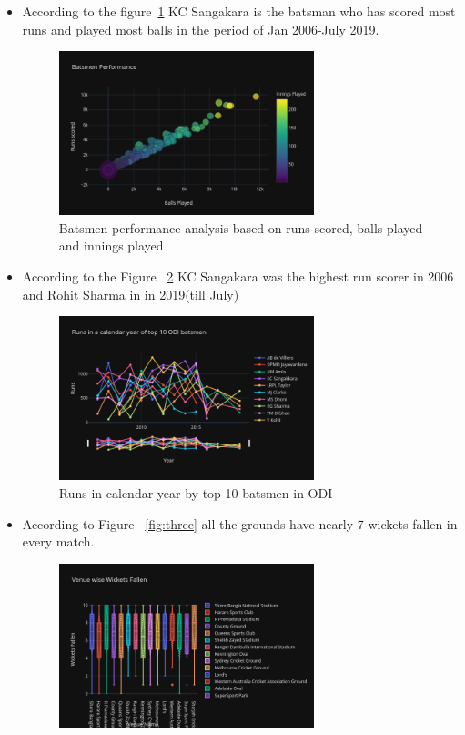\documentclass[fleqn,10pt]{wlscirep}
\begin{document}
\begin{itemize}
    \item According to the figure~\ref{fig:one} KC Sangakara is the batsman who has scored most runs and played most balls in the period of Jan 2006-July 2019.
    \begin{figure}[H]
        \centering
        \includegraphics[width=0.7\textwidth]{bats.png}
        \caption{Batsmen performance analysis based on runs scored, balls played and innings played}
        \label{fig:one}
      \end{figure}
      \item According to the Figure ~\ref{fig:two} KC Sangakara was the highest run scorer in 2006 and Rohit Sharma in in 2019(till July)
      \begin{figure}[H]
        \centering
        \includegraphics[width=0.7\textwidth]{batsmen.png}
        \caption{Runs in calendar year by top 10 batsmen in ODI}
        \label{fig:two}
      \end{figure}
      \item According to Figure ~\ref{fig:three} all the grounds have nearly 7 wickets fallen in every match.
      \begin{figure}[H]
        \centering
        \includegraphics[width=0.7\textwidth]{wicvenue.png}

\end{figure}
\end{itemize}
\end{document}
